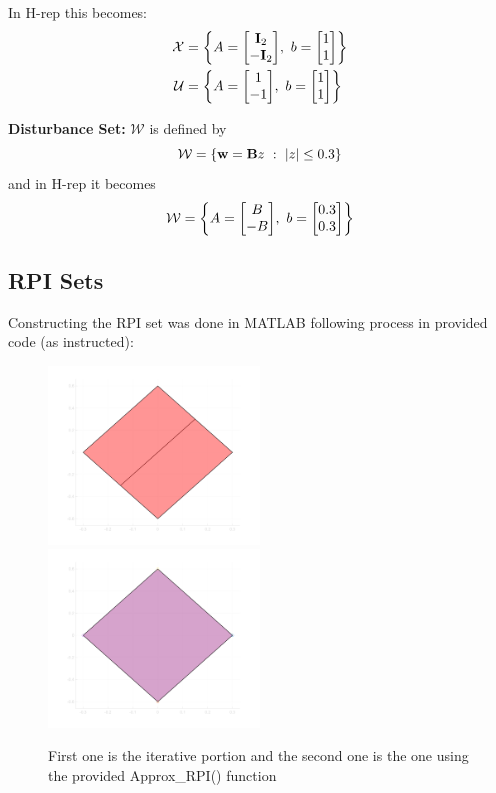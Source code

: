 \documentclass[]{article}
\newcommand{\st}{\ : \ }
\begin{document}
In H-rep this becomes:
\begin{equation}
    \begin{aligned}
        \mathcal{X} &= \qty{A = \mqty[\vb{I}_2\\-\vb{I}_2], \ b = \mqty[1\\1]}\\
        \mathcal{U} &= \qty{A = \mqty[1\\-1], \ b = \mqty[1\\1]}
    \end{aligned}
\end{equation}

\textbf{Disturbance Set:}
$\mathcal{W}$ is defined by 
\begin{equation}
    \mathcal{W} = \{\vb{w} = \mathbf{B} z \st \abs{z} \leq 0.3\}
\end{equation}
and in H-rep it becomes
\begin{equation}
    \mathcal{W} = \qty{A = \mqty[B\\-B], \ b = \mqty[0.3\\0.3]}
\end{equation}

\newpage
\subsection{RPI Sets}
Constructing the RPI set was done in MATLAB following process in provided code (as instructed):
\begin{figure}[h]
    \centering
    \includegraphics[width=0.5\textwidth]{figs/pblm2b_1.png}\\
    \includegraphics[width=0.5\textwidth]{figs/pblm2b_2.png}
    \caption{First one is the iterative portion and the second one is the one using the provided Approx\_RPI() function}
\end{figure}
\end{document}
